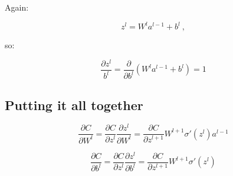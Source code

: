\documentclass{article}
\begin{document}
Again: 

\begin{equation}
z^{l} = W^{l}a^{l-1} + b^{l}~,
\end{equation}

so:

\begin{equation}
\frac{\partial z^l}{b^l} = \frac{\partial}{\partial b^l}(W^{l}a^{l-1} + b^{l}) = 1
\end{equation}

\subsection{Putting it all together}

\begin{equation}
\frac{\partial C}{\partial W^l} = \frac{\partial C}{\partial z^l}\frac{\partial z^l}{\partial W^l} = \frac{\partial C}{\partial z^{l+1}}W^{l+1}\sigma'(z^l) a^{l-1}
\end{equation}

\begin{equation}
\frac{\partial C}{\partial b^l} = \frac{\partial C}{\partial z^l}\frac{\partial z^l}{\partial b^l} = \frac{\partial C}{\partial z^{l+1}}W^{l+1}\sigma'(z^l)
\end{equation}
\end{document}

